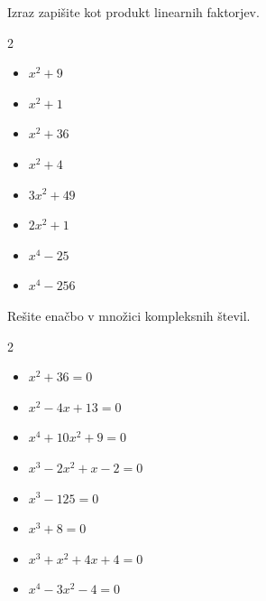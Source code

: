      
                
            \begin{naloga}
                Izraz zapišite kot produkt linearnih faktorjev.

                \begin{multicols}{2}
                    
                \begin{itemize}
                        \item $ x^2+9 $ 
                        \item $ x^2+1 $ 
                        \item $ x^2+36 $ 
                        \item $ x^2+4 $ 
                        \item $ 3x^2+49 $ 
                        \item $ 2x^2+1 $ 
                        \item $ x^4-25 $ 
                        \item $ x^4-256 $ 
                    \end{itemize}
                \end{multicols}
            \end{naloga}

       

            \begin{naloga}
                Rešite enačbo v množici kompleksnih števil.

                \begin{multicols}{2}
                    
                \begin{itemize}
                        \item $ x^2+36=0 $ 
                        \item $ x^2-4x+13=0 $ 
                        \item $ x^4+10x^2+9=0 $ 
                        \item $ x^3-2x^2+x-2=0 $ 
                        \item $ x^3-125=0 $ 
                        \item $ x^3+8=0 $ 
                        \item $ x^3+x^2+4x+4=0 $ 
                        \item $ x^4-3x^2-4=0 $ 
                    \end{itemize}
                \end{multicols}
            \end{naloga}

